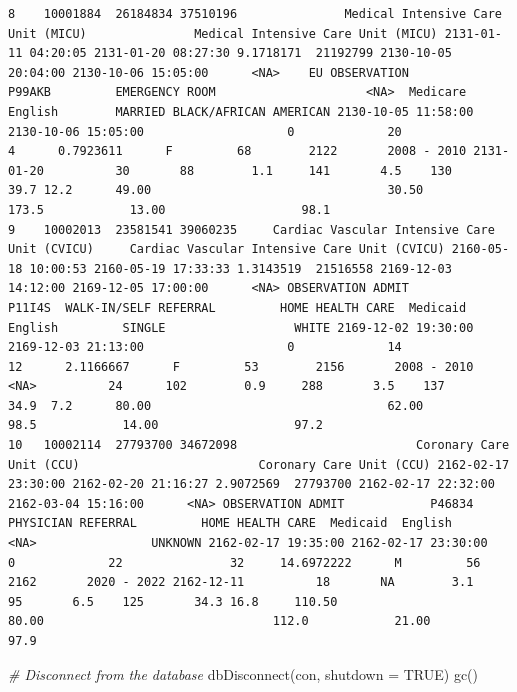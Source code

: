 \documentclass[
]{article}
\newenvironment{Shaded}{\begin{snugshade}}{\end{snugshade}}
\newcommand{\AttributeTok}[1]{\textcolor[rgb]{0.77,0.63,0.00}{#1}}
\newcommand{\CommentTok}[1]{\textcolor[rgb]{0.56,0.35,0.01}{\textit{#1}}}
\newcommand{\ConstantTok}[1]{\textcolor[rgb]{0.00,0.00,0.00}{#1}}
\newcommand{\FunctionTok}[1]{\textcolor[rgb]{0.00,0.00,0.00}{#1}}
\newcommand{\NormalTok}[1]{\textcolor[rgb]{0.00,0.00,0.00}{#1}}
\begin{document}
\begin{verbatim}
8    10001884  26184834 37510196               Medical Intensive Care Unit (MICU)               Medical Intensive Care Unit (MICU) 2131-01-11 04:20:05 2131-01-20 08:27:30 9.1718171  21192799 2130-10-05 20:04:00 2130-10-06 15:05:00      <NA>    EU OBSERVATION            P99AKB         EMERGENCY ROOM                     <NA>  Medicare  English        MARRIED BLACK/AFRICAN AMERICAN 2130-10-05 11:58:00 2130-10-06 15:05:00                    0             20                4      0.7923611      F         68        2122       2008 - 2010 2131-01-20          30       88        1.1     141       4.5    130       39.7 12.2      49.00                                 30.50                                173.5            13.00                   98.1
9    10002013  23581541 39060235     Cardiac Vascular Intensive Care Unit (CVICU)     Cardiac Vascular Intensive Care Unit (CVICU) 2160-05-18 10:00:53 2160-05-19 17:33:33 1.3143519  21516558 2169-12-03 14:12:00 2169-12-05 17:00:00      <NA> OBSERVATION ADMIT            P11I4S  WALK-IN/SELF REFERRAL         HOME HEALTH CARE  Medicaid  English         SINGLE                  WHITE 2169-12-02 19:30:00 2169-12-03 21:13:00                    0             14               12      2.1166667      F         53        2156       2008 - 2010       <NA>          24      102        0.9     288       3.5    137       34.9  7.2      80.00                                 62.00                                 98.5            14.00                   97.2
10   10002114  27793700 34672098                         Coronary Care Unit (CCU)                         Coronary Care Unit (CCU) 2162-02-17 23:30:00 2162-02-20 21:16:27 2.9072569  27793700 2162-02-17 22:32:00 2162-03-04 15:16:00      <NA> OBSERVATION ADMIT            P46834     PHYSICIAN REFERRAL         HOME HEALTH CARE  Medicaid  English           <NA>                UNKNOWN 2162-02-17 19:35:00 2162-02-17 23:30:00                    0             22               32     14.6972222      M         56        2162       2020 - 2022 2162-12-11          18       NA        3.1      95       6.5    125       34.3 16.8     110.50                                 80.00                                112.0            21.00                   97.9
\end{verbatim}

\begin{Shaded}
\begin{Highlighting}[]
\CommentTok{\# Disconnect from the database}
\FunctionTok{dbDisconnect}\NormalTok{(con, }\AttributeTok{shutdown =} \ConstantTok{TRUE}\NormalTok{)}
\FunctionTok{gc}\NormalTok{()}
\end{Highlighting}
\end{Shaded}
\end{document}
